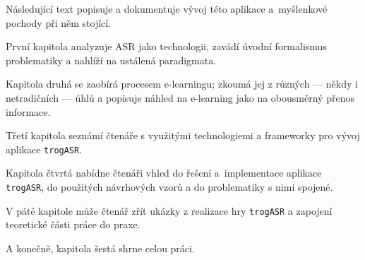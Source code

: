 Následující text popisuje a dokumentuje vývoj této aplikace a~myšlenkové pochody při něm stojící. 

První kapitola analyzuje ASR jako technologii, zavádí úvodní formalismus problematiky a nahlíží na ustálená paradigmata. 

Kapitola druhá se zaobírá procesem e-learningu; zkoumá jej z různých --- někdy i netradičních --- úhlů a popisuje náhled na e-learning jako na obousměrný přenos informace. 

Třetí kapitola seznámí čtenáře s využitými technologiemi a frameworky pro vývoj aplikace \verb|trogASR|. 

Kapitola čtvrtá nabídne čtenáři vhled do řešení a~implementace aplikace \verb|trogASR|, do použitých návrhových vzorů a do problematiky s nimi spojené. 

V páté kapitole může čtenář zřít ukázky z realizace hry \verb|trogASR| a zapojení teoretické části práce do praxe. 

A konečně, kapitola šestá shrne celou práci.